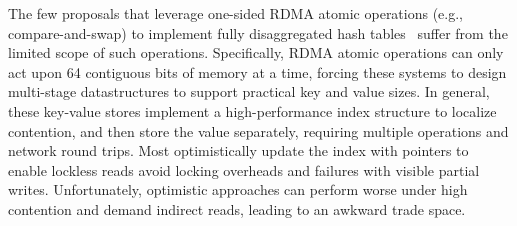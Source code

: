 %
The few proposals that leverage one-sided RDMA atomic
operations (e.g., compare-and-swap) to implement fully
disaggregated hash tables~\cite{rolex,fusee,sherman, race}
suffer from the limited scope of such operations.
Specifically, RDMA atomic operations can only act upon 64
contiguous bits of memory at a time, forcing these systems
to design multi-stage datastructures to support practical
key and value sizes.  In general, these key-value stores
implement a high-performance index structure to localize
contention, and then store the value separately, requiring
multiple operations and network round trips. Most
optimistically update the index with pointers to enable
lockless reads avoid locking overheads and failures with
visible partial writes.  Unfortunately, optimistic
approaches can perform worse under high contention and
demand indirect reads, leading to an awkward trade space.




